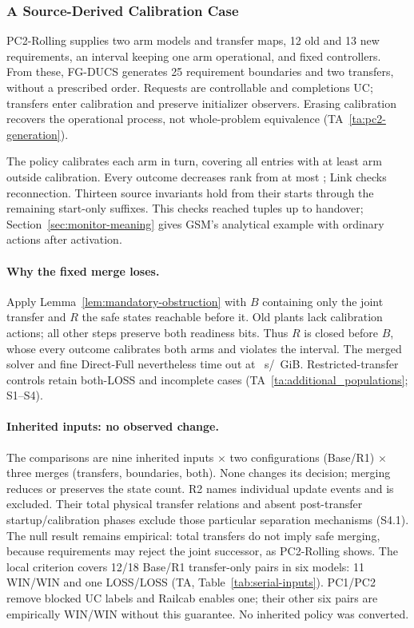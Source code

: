 \documentclass[acmsmall,screen,review,anonymous]{acmart}
\begin{document}
\subsubsection{A Source-Derived Calibration Case}\label{sec:pc2-case}
PC2-Rolling supplies two arm models and transfer maps, 12 old and 13 new requirements, an interval keeping one arm operational, and fixed controllers. From these, FG-DUCS generates 25 requirement boundaries and two transfers, without a prescribed order. Requests are controllable and completions UC; transfers enter calibration and preserve initializer observers. Erasing calibration recovers the operational process, not whole-problem equivalence (TA~\ref{ta:pc2-generation}).

The policy calibrates each arm in turn, covering all \PCTwoCaseEntries{} entries with at least \PCTwoCaseMinOperationalArms{} arm outside calibration. Every outcome decreases rank from at most \PCTwoCaseMaxRank{}; Link checks reconnection. Thirteen source invariants hold from their starts through the remaining start-only suffixes. This checks reached tuples up to handover; Section~\ref{sec:monitor-meaning} gives GSM's analytical example with ordinary actions after activation.

\paragraph{Why the fixed merge loses.}
Apply Lemma~\ref{lem:mandatory-obstruction} with $B$ containing only the joint transfer and $R$ the safe states reachable before it. Old plants lack calibration actions; all other steps preserve both readiness bits. Thus $R$ is closed before $B$, whose every outcome calibrates both arms and violates the interval. The merged solver and fine Direct-Full nevertheless time out at \VThreeESixPCTwoCap{}~s/\VThreeESixPCTwoHeap{}~GiB. Restricted-transfer controls retain both-LOSS and incomplete cases (TA~\ref{ta:additional_populations}; S1--S4).

\paragraph{Inherited inputs: no observed change.}
The \VThreeEOneTrials{} comparisons are nine inherited inputs $\times$ two configurations (Base/R1) $\times$ three merges (transfers, boundaries, both). None changes its decision; merging reduces or preserves the state count. R2 names individual update events and is excluded. Their total physical transfer relations and absent post-transfer startup/calibration phases exclude those particular separation mechanisms (S4.1). The null result remains empirical: total transfers do not imply safe merging, because requirements may reject the joint successor, as PC2-Rolling shows. The local criterion covers 12/18 Base/R1 transfer-only pairs in six models: 11 WIN/WIN and one LOSS/LOSS (TA, Table~\ref{tab:serial-inputs}). PC1/PC2 remove blocked UC labels and Railcab enables one; their other six pairs are empirically WIN/WIN without this guarantee. No inherited policy was converted.
\end{document}
